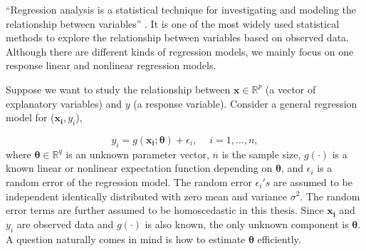 \documentclass[
]{book}
\theoremstyle{definition}
\theoremstyle{definition}
\theoremstyle{definition}
\theoremstyle{definition}
\theoremstyle{remark}
\begin{document}
``Regression analysis is a statistical technique for investigating and modeling the relationship between variables'' \citep{montgomery2012introduction}. It is one of the most widely used statistical methods to explore the relationship between variables based on observed data. Although there are different kinds of regression models, we mainly focus on one response linear and nonlinear regression models.

Suppose we want to study the relationship between \(\boldsymbol{x}\in \mathbb{R}^p\) (a vector of explanatory variables) and \(y\) (a response variable). Consider a general regression model for (\(\boldsymbol{x_i},y_i\)),

\begin{equation}
y_i=g\left(\boldsymbol{x_i};\boldsymbol{\theta}\right)+\epsilon_i,\quad ~i=1,\dots,n,
\label{eq:simple-regression}
\end{equation}
where \(\boldsymbol{\theta}\in \mathbb{R}^q\) is an unknown parameter vector, \(n\) is the sample size, \(g(\cdot)\) is a known linear or nonlinear expectation function depending on \(\boldsymbol{\theta}\), and \(\epsilon_i\) is a random error of the regression model. The random error \(\epsilon_i's\) are assumed to be independent identically distributed with zero mean and variance \(\sigma^2\). The random error terms are further assumed to be homoscedastic in this thesis. Since \(\boldsymbol{x_i}\) and \(y_i\) are observed data and \(g(\cdot)\) is also known, the only unknown component is \(\boldsymbol{\theta}\). A question naturally comes in mind is how to estimate \(\boldsymbol{\theta}\) efficiently.
\end{document}
